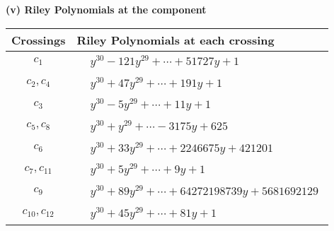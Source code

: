 \documentclass[1p]{elsarticle_modified}
\theoremstyle{definition}
\begin{document}
\newpage\renewcommand{\arraystretch}{1}
\flushleft \textbf{(v) Riley Polynomials at the component}\newline \\
\begin{tabular}{m{50pt}|m{274pt}}
Crossings & \hspace{64pt}Riley Polynomials at each crossing \\
\hline $$\begin{aligned}c_{1}\end{aligned}$$&$\begin{aligned}
&y^{30}-121 y^{29}+\cdots+51727 y+1
\end{aligned}$\\
\hline $$\begin{aligned}c_{2},c_{4}\end{aligned}$$&$\begin{aligned}
&y^{30}+47 y^{29}+\cdots+191 y+1
\end{aligned}$\\
\hline $$\begin{aligned}c_{3}\end{aligned}$$&$\begin{aligned}
&y^{30}-5 y^{29}+\cdots+11 y+1
\end{aligned}$\\
\hline $$\begin{aligned}c_{5},c_{8}\end{aligned}$$&$\begin{aligned}
&y^{30}+y^{29}+\cdots-3175 y+625
\end{aligned}$\\
\hline $$\begin{aligned}c_{6}\end{aligned}$$&$\begin{aligned}
&y^{30}+33 y^{29}+\cdots+2246675 y+421201
\end{aligned}$\\
\hline $$\begin{aligned}c_{7},c_{11}\end{aligned}$$&$\begin{aligned}
&y^{30}+5 y^{29}+\cdots+9 y+1
\end{aligned}$\\
\hline $$\begin{aligned}c_{9}\end{aligned}$$&$\begin{aligned}
&y^{30}+89 y^{29}+\cdots+64272198739 y+5681692129
\end{aligned}$\\
\hline $$\begin{aligned}c_{10},c_{12}\end{aligned}$$&$\begin{aligned}
&y^{30}+45 y^{29}+\cdots+81 y+1
\end{aligned}$\\
\hline
\end{tabular}\\~\\
\end{document}
